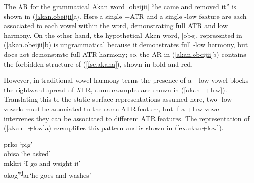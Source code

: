 \documentclass[floatsintext,man]{apa6}
\theoremstyle{definition}
\theoremstyle{definition}
\theoremstyle{definition}
\theoremstyle{remark}
\begin{document}
The AR for the grammatical Akan word {[}obeijii{]} \enquote{he came and
removed it} is shown in (\ref{akan.obeijii}a). Here a single +ATR and a
single -low feature are each associated to each vowel within the word,
demonstrating full ATR and low harmony. On the other hand, the
hypothetical Akan word, {[}obej\textipa{II}{]}, represented in
(\ref{akan.obeijii}b) is ungrammatical because it demonstrates full -low
harmony, but does not demonstrate full ATR harmony; so, the AR in
(\ref{akan.obeijii}b) contains the forbidden structure of
(\ref{fsc.akana}), shown in bold and red.

However, in traditional vowel harmony terms the presence of a +low vowel
blocks the rightward spread of ATR, some examples are shown in
(\ref{akan_+low}). Translating this to the static surface
representations assumed here, two -low vowels must be associated to the
same ATR feature, but if a +low vowel intervenes they can be associated
to different ATR features. The representation of (\ref{akan_+low}a)
exemplifies this pattern and is shown in (\ref{ex.akan+low}).

\begin{exe}
  \label{akan_+low} 
  \begin{xlist}
    \ex prko  `pig'                                        \\
    \ex obisa `he asked'                                              \\
    \ex mkkri  `I go and weight it'   \\
    \ex okog\textsuperscript{w}\textsuperscript{j}ar\textraiseglotstop `he goes and washes' \\
  \end{xlist}
\end{exe}

\begin{exe}
\label{ex.akan+low} 
\end{exe}
\end{document}
